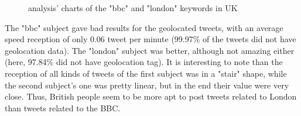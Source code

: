 \documentclass[a4paper,11pt]{report}
\begin{document}
\begin{figure}[H]
\vspace{-5pt}
\begin{center}
\vspace{-20pt}
\caption{analysis' charts of the "bbc" and "london" keywords in UK}
\end{center}
\end{figure}
\vspace{-10pt}

The "bbc" subject gave bad results for the geolocated tweets, with an average speed reception of only 0.06 tweet per minute (99.97\% of the tweets did not have geolocation data). The "london" subject was better, although not amazing either (here, 97.84\% did not have geolocation tag). It is interesting to note than the reception of all kinds of tweets of the first subject was in a "stair" shape, while the second subject's one was pretty linear, but in the end their value were very close. Thus, British people seem to be more apt to post tweets related to London than tweets related to the BBC.
\bigskip
\end{document}
